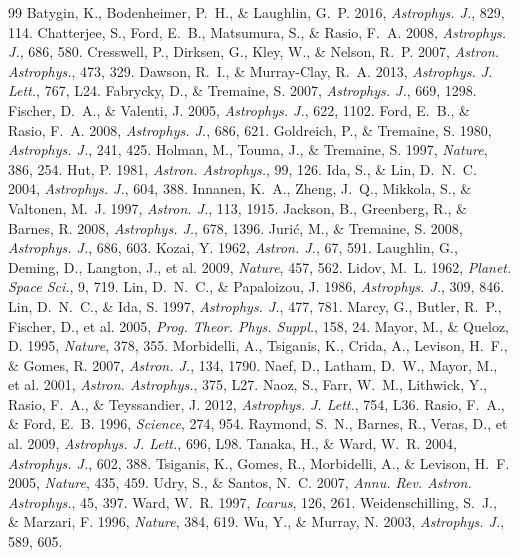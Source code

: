 \documentclass[11pt,a4paper]{article}
\begin{document}
\begin{thebibliography}{99}
 Batygin, K., Bodenheimer, P.~H., \& Laughlin, G.~P. 2016, \textit{Astrophys. J.}, 829, 114.
 Chatterjee, S., Ford, E.~B., Matsumura, S., \& Rasio, F.~A. 2008, \textit{Astrophys. J.}, 686, 580.
 Cresswell, P., Dirksen, G., Kley, W., \& Nelson, R.~P. 2007, \textit{Astron. Astrophys.}, 473, 329.
 Dawson, R.~I., \& Murray-Clay, R.~A. 2013, \textit{Astrophys. J. Lett.}, 767, L24.
 Fabrycky, D., \& Tremaine, S. 2007, \textit{Astrophys. J.}, 669, 1298.
 Fischer, D.~A., \& Valenti, J. 2005, \textit{Astrophys. J.}, 622, 1102.
 Ford, E.~B., \& Rasio, F.~A. 2008, \textit{Astrophys. J.}, 686, 621.
 Goldreich, P., \& Tremaine, S. 1980, \textit{Astrophys. J.}, 241, 425.
 Holman, M., Touma, J., \& Tremaine, S. 1997, \textit{Nature}, 386, 254.
 Hut, P. 1981, \textit{Astron. Astrophys.}, 99, 126.
 Ida, S., \& Lin, D.~N.~C. 2004, \textit{Astrophys. J.}, 604, 388.
 Innanen, K.~A., Zheng, J.~Q., Mikkola, S., \& Valtonen, M.~J. 1997, \textit{Astron. J.}, 113, 1915.
 Jackson, B., Greenberg, R., \& Barnes, R. 2008, \textit{Astrophys. J.}, 678, 1396.
 Juri{\'c}, M., \& Tremaine, S. 2008, \textit{Astrophys. J.}, 686, 603.
 Kozai, Y. 1962, \textit{Astron. J.}, 67, 591.
 Laughlin, G., Deming, D., Langton, J., et al. 2009, \textit{Nature}, 457, 562.
 Lidov, M.~L. 1962, \textit{Planet. Space Sci.}, 9, 719.
 Lin, D.~N.~C., \& Papaloizou, J. 1986, \textit{Astrophys. J.}, 309, 846.
 Lin, D.~N.~C., \& Ida, S. 1997, \textit{Astrophys. J.}, 477, 781.
 Marcy, G., Butler, R.~P., Fischer, D., et al. 2005, \textit{Prog. Theor. Phys. Suppl.}, 158, 24.
 Mayor, M., \& Queloz, D. 1995, \textit{Nature}, 378, 355.
 Morbidelli, A., Tsiganis, K., Crida, A., Levison, H.~F., \& Gomes, R. 2007, \textit{Astron. J.}, 134, 1790.
 Naef, D., Latham, D.~W., Mayor, M., et al. 2001, \textit{Astron. Astrophys.}, 375, L27.
 Naoz, S., Farr, W.~M., Lithwick, Y., Rasio, F.~A., \& Teyssandier, J. 2012, \textit{Astrophys. J. Lett.}, 754, L36.
 Rasio, F.~A., \& Ford, E.~B. 1996, \textit{Science}, 274, 954.
 Raymond, S.~N., Barnes, R., Veras, D., et al. 2009, \textit{Astrophys. J. Lett.}, 696, L98.
 Tanaka, H., \& Ward, W.~R. 2004, \textit{Astrophys. J.}, 602, 388.
 Tsiganis, K., Gomes, R., Morbidelli, A., \& Levison, H.~F. 2005, \textit{Nature}, 435, 459.
 Udry, S., \& Santos, N.~C. 2007, \textit{Annu. Rev. Astron. Astrophys.}, 45, 397.
 Ward, W.~R. 1997, \textit{Icarus}, 126, 261.
 Weidenschilling, S.~J., \& Marzari, F. 1996, \textit{Nature}, 384, 619.
 Wu, Y., \& Murray, N. 2003, \textit{Astrophys. J.}, 589, 605.
\end{thebibliography}
\end{document}
